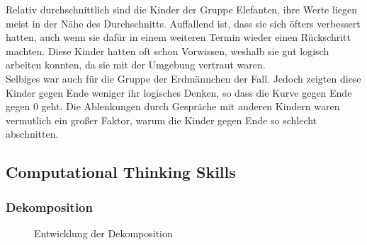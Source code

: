 Relativ durchschnittlich sind die Kinder der Gruppe Elefanten, ihre Werte liegen meist in der Nähe des Durchschnitts. Auffallend ist, dass sie sich öfters verbessert hatten, auch wenn sie dafür in einem weiteren Termin wieder einen Rückschritt machten. Diese Kinder hatten oft schon Vorwissen, weshalb sie gut logisch arbeiten konnten, da sie mit der Umgebung vertraut waren.\\
Selbiges war auch für die Gruppe der Erdmännchen der Fall. Jedoch zeigten diese Kinder gegen Ende weniger ihr logisches Denken, so dass die Kurve gegen Ende gegen 0 geht. Die Ablenkungen durch Gespräche mit anderen Kindern waren vermutlich ein großer Faktor, warum die Kinder gegen Ende so schlecht abschnitten.


\subsection{Computational Thinking Skills}

\subsubsection{Dekomposition}
\begin{figure}[H]
	\centering
	\caption{Entwicklung der Dekomposition}
\end{figure}


